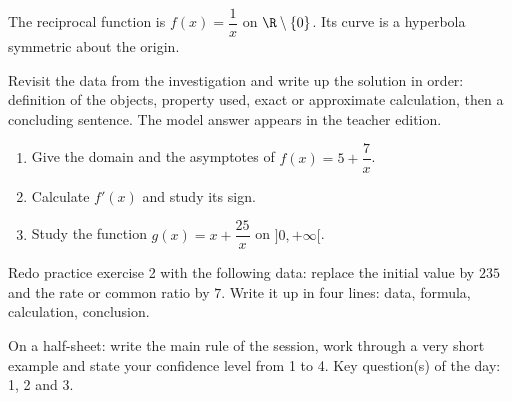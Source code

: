 \begin{traceecrite}The reciprocal function is $f(x)=\dfrac1x$ on $\R\setminus\{0\}$. Its curve is a hyperbola symmetric about the origin.\end{traceecrite}

\begin{exemple}
Revisit the data from the investigation and write up the solution in order: definition of the objects, property used, exact or approximate calculation, then a concluding sentence. The model answer appears in the teacher edition.
\end{exemple}

\begin{exercice}[-- essential]
\begin{enumerate}\item Give the domain and the asymptotes of $f(x)=5+\dfrac{7}x$.\item Calculate $f'(x)$ and study its sign.\item Study the function $g(x)=x+\dfrac{25}x$ on $]0,+\infty[$.\end{enumerate}
\end{exercice}


\begin{dm}Redo practice exercise 2 with the following data: replace the initial value by $235$ and the rate or common ratio by $7$. Write it up in four lines: data, formula, calculation, conclusion.\end{dm}

\begin{sortie}On a half-sheet: write the main rule of the session, work through a very short example and state your confidence level from 1 to 4. Key question(s) of the day: 1, 2 and 3.\end{sortie}

